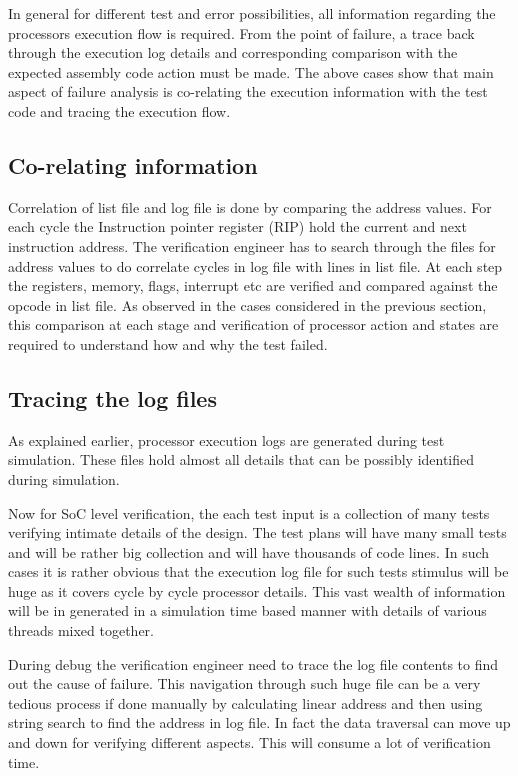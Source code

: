 In general for different test and error possibilities, all information regarding the processors execution flow is required. From the point of failure, a trace back through the execution log details and corresponding comparison with the expected assembly code action must be made. 
The above cases show that main aspect of failure analysis is co-relating the execution information with the test code and tracing the execution flow. 

\subsection{Co-relating information}

Correlation of list file and log file is done by comparing the address values. For each cycle the Instruction pointer register (RIP) hold the current and next instruction address. The verification engineer has to search through the files for address values to do correlate cycles in log file with lines in list file. At each step the registers, memory, flags, interrupt etc are verified and compared against the opcode in list file. As observed in the cases considered in the previous section, this comparison at each stage and verification of processor action and states are required to understand how and why the test failed.

\subsection{Tracing the log files}
 
As explained earlier, processor execution logs are generated during test simulation. These files hold almost all details that can be possibly identified during simulation. 

Now for SoC level verification, the each test input is a collection of many tests verifying intimate details of the design. The test plans will have many small tests and will be rather big collection and will have thousands of code lines. 
In such cases it is rather obvious that the execution log file for such tests stimulus will be huge as it covers cycle by cycle processor details.  This vast wealth of information will be in generated in a simulation time based manner with details of various threads mixed together. 

During debug the verification engineer need to trace the log file contents to find out the cause of failure. This navigation through such huge file can be a very tedious process if done manually by calculating linear address and then using string search to find the address in log file.  In fact the data traversal can move up and down for verifying different aspects. This will consume a lot of verification time. 

